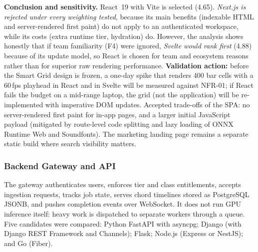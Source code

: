 \documentclass[a4paper]{article}
\begin{document}
\textbf{Conclusion and sensitivity.} React~19 with Vite is selected (4.65). \emph{Next.js is rejected under every weighting tested}, because its main benefits (indexable HTML and server-rendered first paint) do not apply to an authenticated workspace, while its costs (extra runtime tier, hydration) do. However, the analysis shows honestly that if team familiarity (F4) were ignored, \emph{Svelte would rank first} (4.88) because of its update model, so React is chosen for team and ecosystem reasons rather than for superior raw rendering performance. \textbf{Validation action:} before the Smart Grid design is frozen, a one-day spike that renders 400 bar cells with a 60\,fps playhead in React and in Svelte will be measured against NFR-01; if React fails the budget on a mid-range laptop, the grid (not the application) will be re-implemented with imperative DOM updates. Accepted trade-offs of the SPA: no server-rendered first paint for in-app pages, and a larger initial JavaScript payload (mitigated by route-level code splitting and lazy loading of ONNX Runtime Web and Soundfonts). The marketing landing page remains a separate static build where search visibility matters.

\subsubsection{Backend Gateway and API}\label{sec:be_eval}

The gateway authenticates users, enforces tier and class entitlements, accepts ingestion requests, tracks job state, serves chord timelines stored as PostgreSQL JSONB, and pushes completion events over WebSocket. It does not run GPU inference itself: heavy work is dispatched to separate workers through a queue. Five candidates were compared: Python FastAPI with asyncpg; Django (with Django REST Framework and Channels); Flask; Node.js (Express or NestJS); and Go (Fiber).
\end{document}
